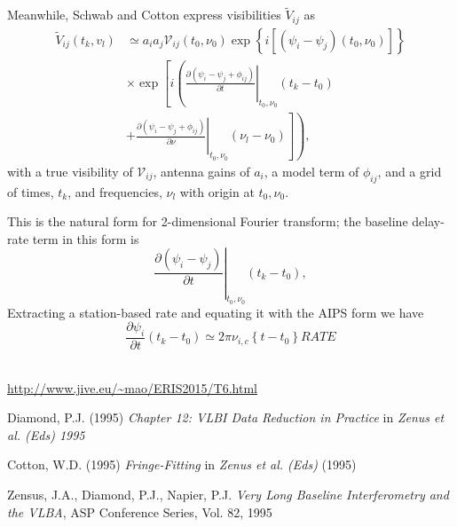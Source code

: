 \documentclass[11pt, twoside, a4paper]{article}
\begin{document}
Meanwhile, Schwab and Cotton express visibilities $\widetilde{V}_{ij}$ as 
\begin{equation*}
  \begin{split}
  \widetilde{V}_{ij}(t_k, v_l) &\simeq a_i a_j \mathcal{V}_{ij}(t_0, \nu_0) 
  \exp
  \left\{i
    \left[(\psi_i-\psi_j)(t_0, \nu_0) \right]
  \right\} \\
  &\times\exp
  \left[i\left(
      \left.
        \frac{\partial (\psi_i-\psi_j + \phi_{ij})}{\partial t}
      \right|_{t_0, \nu_0} (t_k-t_0) \right.\right.
        \\
      &+ \left.\left.\left.
        \frac{\partial (\psi_i-\psi_j + \phi_{ij})}{\partial \nu}
      \right|_{t_0, \nu_0} (\nu_l-\nu_0)
      \right] \right),
  \end{split}
\end{equation*}
with a true visibility of $\mathcal{V}_{ij}$,
antenna gains of $a_i$,
a model term of $\phi_{ij}$,
and a grid of times, $t_k$,
and frequencies, $\nu_l$ with origin at $t_0, \nu_0$.

This is the natural form for 2-dimensional Fourier transform; the
baseline delay-rate term in this form is 
\[
\left.\frac{\partial (\psi_i-\psi_j)}{\partial t} \right|_{t_0,
    \nu_0} (t_k-t_0),
\]
Extracting a station-based rate and equating it with the AIPS form we have
\begin{equation}
  \frac{\partial \psi_i}{\partial t} (t_k - t_0) \simeq
  2\pi \nu_{i,c} \left\{t-t_0\right\} \mathit{RATE} 
\end{equation}


\begin{thebibliography}{99} 
\\ \url{http://www.jive.eu/~mao/ERIS2015/T6.html}

 Diamond, P.J. (1995)
  {\it Chapter 12: VLBI Data Reduction in Practice} in {\it Zenus et  al. (Eds) 1995}

 Cotton, W.D. (1995) {\it
  Fringe-Fitting} in {\it Zenus et  al. (Eds)} (1995)

  
 Zensus, J.A., Diamond, P.J.,
  Napier, P.J. {\it Very Long Baseline Interferometry and the VLBA},
  ASP Conference Series, Vol. 82, 1995
\end{thebibliography}
\end{document}

